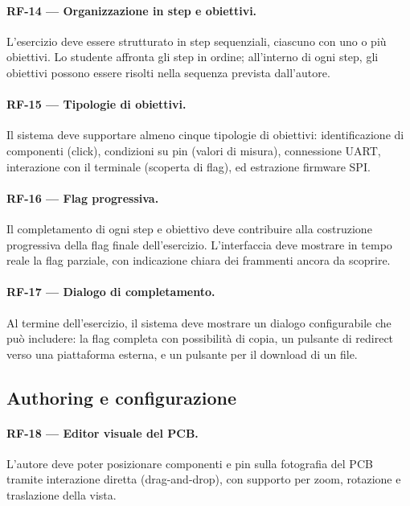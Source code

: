 \paragraph{RF-14 --- Organizzazione in step e obiettivi.} L'esercizio deve essere strutturato in step sequenziali, ciascuno con uno o più obiettivi. Lo studente affronta gli step in ordine; all'interno di ogni step, gli obiettivi possono essere risolti nella sequenza prevista dall'autore.

\paragraph{RF-15 --- Tipologie di obiettivi.} Il sistema deve supportare almeno cinque tipologie di obiettivi: identificazione di componenti (click), condizioni su pin (valori di misura), connessione UART, interazione con il terminale (scoperta di flag), ed estrazione firmware SPI.

\paragraph{RF-16 --- Flag progressiva.} Il completamento di ogni step e obiettivo deve contribuire alla costruzione progressiva della flag finale dell'esercizio. L'interfaccia deve mostrare in tempo reale la flag parziale, con indicazione chiara dei frammenti ancora da scoprire.

\paragraph{RF-17 --- Dialogo di completamento.} Al termine dell'esercizio, il sistema deve mostrare un dialogo configurabile che può includere: la flag completa con possibilità di copia, un pulsante di redirect verso una piattaforma esterna, e un pulsante per il download di un file.

\subsection{Authoring e configurazione}
\label{subsec:rf-authoring}

\paragraph{RF-18 --- Editor visuale del PCB.} L'autore deve poter posizionare componenti e pin sulla fotografia del PCB tramite interazione diretta (drag-and-drop), con supporto per zoom, rotazione e traslazione della vista.

